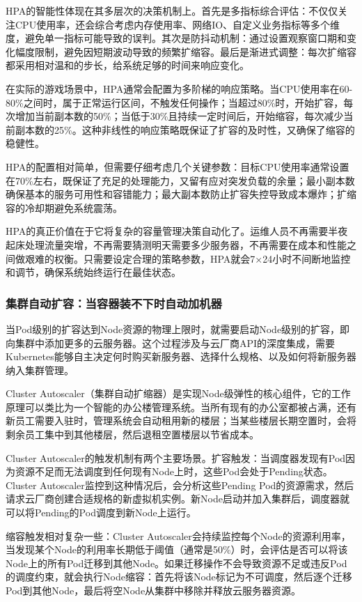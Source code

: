 HPA的智能性体现在其多层次的决策机制上。首先是多指标综合评估：不仅仅关注CPU使用率，还会综合考虑内存使用率、网络IO、自定义业务指标等多个维度，避免单一指标可能导致的误判。其次是防抖动机制：通过设置观察窗口期和变化幅度限制，避免因短期波动导致的频繁扩缩容。最后是渐进式调整：每次扩缩容都采用相对温和的步长，给系统足够的时间来响应变化。

在实际的游戏场景中，HPA通常会配置为多阶梯的响应策略。当CPU使用率在60-80\%之间时，属于正常运行区间，不触发任何操作；当超过80\%时，开始扩容，每次增加当前副本数的50\%；当低于30\%且持续一定时间后，开始缩容，每次减少当前副本数的25\%。这种非线性的响应策略既保证了扩容的及时性，又确保了缩容的稳健性。

HPA的配置相对简单，但需要仔细考虑几个关键参数：目标CPU使用率通常设置在70\%左右，既保证了充足的处理能力，又留有应对突发负载的余量；最小副本数确保基本的服务可用性和容错能力；最大副本数防止扩容失控导致成本爆炸；扩缩容的冷却期避免系统震荡。

HPA的真正价值在于它将复杂的容量管理决策自动化了。运维人员不再需要半夜起床处理流量突增，不再需要猜测明天需要多少服务器，不再需要在成本和性能之间做艰难的权衡。只需要设定合理的策略参数，HPA就会7×24小时不间断地监控和调节，确保系统始终运行在最佳状态。

\subsubsection{集群自动扩容：当容器装不下时自动加机器}

当Pod级别的扩容达到Node资源的物理上限时，就需要启动Node级别的扩容，即向集群中添加更多的云服务器。这个过程涉及与云厂商API的深度集成，需要Kubernetes能够自主决定何时购买新服务器、选择什么规格、以及如何将新服务器纳入集群管理。

Cluster Autoscaler（集群自动扩缩器）是实现Node级弹性的核心组件，它的工作原理可以类比为一个智能的办公楼管理系统。当所有现有的办公室都被占满，还有新员工需要入驻时，管理系统会自动租用新的楼层；当某些楼层长期空置时，会将剩余员工集中到其他楼层，然后退租空置楼层以节省成本。

Cluster Autoscaler的触发机制有两个主要场景。扩容触发：当调度器发现有Pod因为资源不足而无法调度到任何现有Node上时，这些Pod会处于Pending状态。Cluster Autoscaler监控到这种情况后，会分析这些Pending Pod的资源需求，然后请求云厂商创建合适规格的新虚拟机实例。新Node启动并加入集群后，调度器就可以将Pending的Pod调度到新Node上运行。

缩容触发相对复杂一些：Cluster Autoscaler会持续监控每个Node的资源利用率，当发现某个Node的利用率长期低于阈值（通常是50\%）时，会评估是否可以将该Node上的所有Pod迁移到其他Node。如果迁移操作不会导致资源不足或违反Pod的调度约束，就会执行Node缩容：首先将该Node标记为不可调度，然后逐个迁移Pod到其他Node，最后将空Node从集群中移除并释放云服务器资源。

